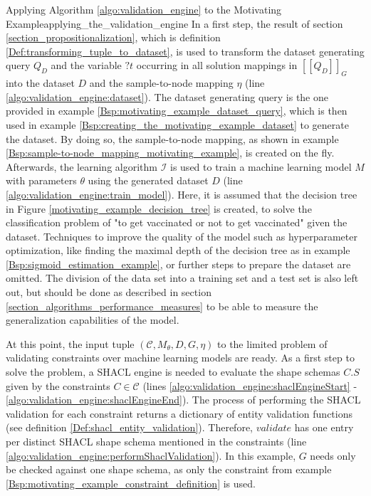     \begin{Bsp}{Applying Algorithm \ref{algo:validation_engine} to the Motivating Example}{applying_the_validation_engine}
        In a first step, the result of section \ref{section_propositionalization}, which is definition \ref{Def:transforming_tuple_to_dataset}, is used to transform the dataset generating query $Q_D$ and the variable $?t$ occurring in all solution mappings in $[[Q_D]]_G$ into the dataset $D$ and the sample-to-node mapping $\eta$ (line \ref{algo:validation_engine:dataset}). The dataset generating query is the one provided in example  \ref{Bsp:motivating_example_dataset_query}, which is then used in example \ref{Bsp:creating_the_motivating_example_dataset} to generate the dataset. By doing so, the sample-to-node mapping, as shown in example \ref{Bsp:sample-to-node_mapping_motivating_example}, is created on the fly. 
        Afterwards, the learning algorithm $\mathcal{I}$ is used to train a machine learning model $M$ with parameters $\theta$ using the generated dataset $D$ (line \ref{algo:validation_engine:train_model}). Here, it is assumed that the decision tree in Figure \ref{motivating_example_decision_tree} is created, to solve the classification problem of "to get vaccinated or not to get vaccinated" given the dataset. Techniques to improve the quality of the model such as hyperparameter optimization, like finding the maximal depth of the decision tree as in example \ref{Bsp:sigmoid_estimation_example}, or further steps to prepare the dataset are omitted. The division of the data set into a training set and a test set is also left out, but should be done as described in section \ref{section_algorithms_performance_measures} to be able to measure the generalization capabilities of the model. 
        
        At this point, the input tuple $(\mathcal{C}, M_\theta, D, G, \eta)$ to the limited problem of validating constraints over machine learning models are ready. As a first step to solve the problem, a SHACL engine is needed to evaluate the shape schemas $C.S$ given by the constraints $C \in \mathcal{C}$ (lines \ref{algo:validation_engine:shaclEngineStart} - \ref{algo:validation_engine:shaclEngineEnd}). The process of performing the SHACL validation for each constraint returns a dictionary of entity validation functions (see definition \ref{Def:shacl_entity_validation}). Therefore, $\textit{validate}$ has one entry per distinct SHACL shape schema mentioned in the constraints (line \ref{algo:validation_engine:performShaclValidation}).
        In this example, $G$ needs only be checked against one shape schema, as only the constraint from example \ref{Bsp:motivating_example_constraint_definition} is used.
        

\end{Bsp}
